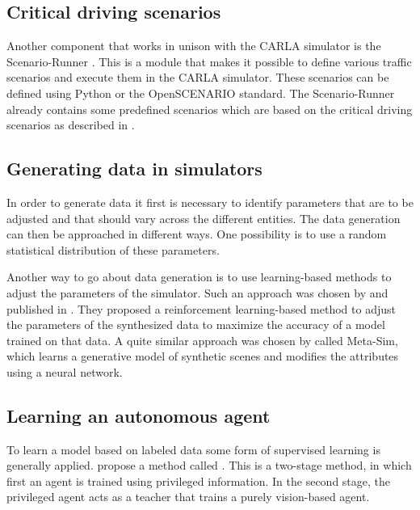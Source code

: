 \documentclass[conference, a4paper, 11pt]{IEEEtran}
\begin{document}
\subsection{Critical driving scenarios}

Another component that works in unison with the CARLA simulator is the Scenario-Runner \cite{CARLA:ScenarioRunner}.
This is a module that makes it possible to define various traffic scenarios and execute them in the CARLA simulator.
These scenarios can be defined using Python or the OpenSCENARIO \cite{OpenScenario} standard.
The Scenario-Runner already contains some predefined scenarios which are based on the critical driving scenarios as described in  \cite{NHTSA:PreCrashScenarios}.

\subsection{Generating data in simulators}

In order to generate data it first is necessary to identify parameters that are to be adjusted and that should vary across the different entities.
The data generation can then be approached in different ways.
One possibility is to use a random statistical distribution of these parameters. 

Another way to go about data generation is to use learning-based methods to adjust the parameters of the simulator.
Such an approach was chosen by \citeauthor{DBLP:LearningToSimulate} and published in  \cite{DBLP:LearningToSimulate}.
They proposed a reinforcement learning-based method to adjust the parameters of the synthesized data to maximize the accuracy of a model trained on that data.
A quite similar approach was chosen by \citeauthor{DBLP:Meta-Sim} \cite{DBLP:Meta-Sim} called Meta-Sim, which learns a generative model of synthetic scenes and modifies the attributes using a neural network.

\subsection{Learning an autonomous agent}

To learn a model based on labeled data some form of supervised learning is generally applied.
\citeauthor{Chen:LearningByCheating} propose a method called  \cite{Chen:LearningByCheating}.
This is a two-stage method, in which first an agent is trained using privileged information.
In the second stage, the privileged agent acts as a teacher that trains a purely vision-based agent.
\end{document}
